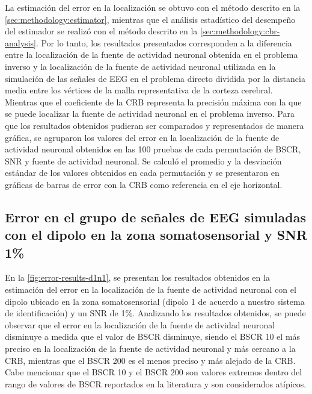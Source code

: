 La estimación del error en la localización se obtuvo con el método descrito en la \cref{sec:methodology:estimator}, mientras que el análisis estadístico del desempeño del estimador se realizó con el método descrito en la \cref{sec:methodology:cbr-analysis}.
Por lo tanto, los resultados presentados corresponden a la diferencia entre la localización de la fuente de actividad neuronal obtenida en el problema inverso y la localización de la fuente de actividad neuronal utilizada en la simulación de las señales de EEG en el problema directo dividida por la distancia media entre los vértices de la malla representativa de la corteza cerebral. 
Mientras que el coeficiente de la CRB representa la precisión máxima con la que se puede localizar la fuente de actividad neuronal en el problema inverso.
Para que los resultados obtenidos pudieran ser comparados y representados de manera gráfica, se agruparon los valores del error en la localización de la fuente de actividad neuronal obtenidos en las 100 pruebas de cada permutación de BSCR, SNR y fuente de actividad neuronal.
Se calculó el promedio y la desviación estándar de los valores obtenidos en cada permutación y se presentaron en gráficas de barras de error con la CRB como referencia en el eje horizontal.

\subsection{Error en el grupo de señales de EEG simuladas con el dipolo en la zona somatosensorial y SNR 1\%}
\label{sec:results:error:d1n1}

En la \cref{fig:error-results-d1n1}, se presentan los resultados obtenidos en la estimación del error en la localización de la fuente de actividad neuronal con el dipolo ubicado en la zona somatosensorial (dipolo 1 de acuerdo a nuestro sistema de identificación) y un SNR de 1\%.
Analizando los resultados obtenidos, se puede observar que el error en la localización de la fuente de actividad neuronal disminuye a medida que el valor de BSCR disminuye, siendo el BSCR 10 el más preciso en la localización de la fuente de actividad neuronal y más cercano a la CRB, mientras que el BSCR 200 es el menos preciso y más alejado de la CRB.
Cabe mencionar que el BSCR 10 y el BSCR 200 son valores extremos dentro del rango de valores de BSCR reportados en la literatura y son considerados atípicos. 


